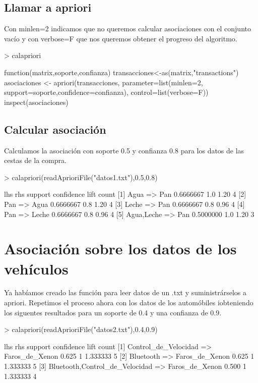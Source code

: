 \documentclass [a4paper] {article}
\begin{document}
\subsection{Llamar a apriori}
Con minlen=2 indicamos que no queremos calcular asociaciones con el conjunto vacío y con verbose=F que nos queremos obtener el progreso del algoritmo.
\begin{Schunk}
\begin{Sinput}
> calapriori
\end{Sinput}
\begin{Soutput}
function(matrix,soporte,confianza){
    transacciones<-as(matrix,"transactions")
    asociaciones <- apriori(transacciones, 
        parameter=list(minlen=2, support=soporte,confidence=confianza), 
        control=list(verbose=F))
    inspect(asociaciones)
}
\end{Soutput}
\end{Schunk}

\subsection{Calcular asociación}
Calculamos la asociación con soporte 0.5 y confianza 0.8 para los datos de las cestas de la compra.
\begin{Schunk}
\begin{Sinput}
> calapriori(readAprioriFile("datos1.txt"),0.5,0.8)
\end{Sinput}
\begin{Soutput}
    lhs             rhs     support   confidence lift count
[1] {Agua}       => {Pan}   0.6666667 1.0        1.20 4    
[2] {Pan}        => {Agua}  0.6666667 0.8        1.20 4    
[3] {Leche}      => {Pan}   0.6666667 0.8        0.96 4    
[4] {Pan}        => {Leche} 0.6666667 0.8        0.96 4    
[5] {Agua,Leche} => {Pan}   0.5000000 1.0        1.20 3    
\end{Soutput}
\end{Schunk}

\section{Asociación sobre los datos de los vehículos}
Ya habíamos creado las función para leer datos de un .txt y suministrárselos a apriori.
Repetimos el proceso ahora con los datos de los automóbiles iobteniendo los siguentes resultados para un soporte de 0.4 y una confianza de 0.9.
\begin{Schunk}
\begin{Sinput}
> calapriori(readAprioriFile("datos2.txt"),0.4,0.9)
\end{Sinput}
\begin{Soutput}
    lhs                                 rhs              support confidence lift     count
[1] {Control_de_Velocidad}           => {Faros_de_Xenon} 0.625   1          1.333333 5    
[2] {Bluetooth}                      => {Faros_de_Xenon} 0.625   1          1.333333 5    
[3] {Bluetooth,Control_de_Velocidad} => {Faros_de_Xenon} 0.500   1          1.333333 4    
\end{Soutput}
\end{Schunk}
\end{document}

